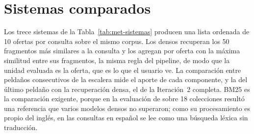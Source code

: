 \section{Sistemas comparados}
\label{sec:met-sistemas}

Los trece sistemas de la Tabla~\ref{tab:met-sistemas} producen una lista ordenada de 10 ofertas por consulta sobre el mismo corpus. Los densos recuperan los 50 fragmentos más similares a la consulta y los agregan por oferta con la máxima similitud entre sus fragmentos, la misma regla del pipeline, de modo que la unidad evaluada es la oferta, que es lo que el usuario ve. La comparación entre peldaños consecutivos de la escalera mide el aporte de cada componente, y la del último peldaño con la recuperación densa, el de la Iteración~2 completa. BM25 es la comparación exigente, porque en la evaluación de \citet{Thakur2021} sobre 18 colecciones resultó una referencia que varios modelos densos no superaron; como su procesamiento es propio del inglés, en las consultas en español se lee como una búsqueda léxica sin traducción.

